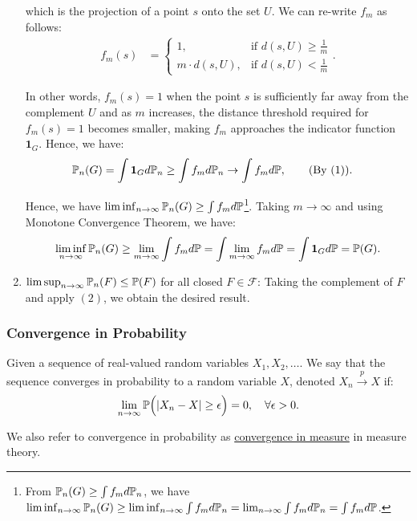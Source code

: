 \begin{proof*}
\begin{enumerate}
        \noindent which is the projection of a point $s$ onto the set $U$. We can re-write $f_m$ as follows:
        \begin{align*}
            f_m(s) &= \begin{cases}
                1, &\text{if } d(s, U) \ge \frac{1}{m} \\
                m\cdot d(s, U), &\text{if } d(s, U) < \frac{1}{m} 
            \end{cases}.
        \end{align*} 

        \noindent In other words, $f_m(s)=1$ when the point $s$ is sufficiently far away from the complement $U$ and as $m$ increases, the distance threshold required for $f_m(s)=1$ becomes smaller, making $f_m$ approaches the indicator function $\boldsymbol{1}_G$. Hence, we have:
        \begin{align*}
            \mathbb{P}_n(G) &= \int \boldsymbol{1}_G d\mathbb{P}_n \ge \int f_md\mathbb{P}_n \to \int f_md\mathbb{P}, \qquad (\text{By (1)}).
        \end{align*} 

        \noindent Hence, we have $\liminf_{n\to\infty}\mathbb{P}_n(G) \ge \int f_md\mathbb{P}$\footnote{From $\mathbb{P}_n(G) \ge \int f_md\mathbb{P}_n$, we have $\liminf_{n\to\infty} \mathbb{P}_n(G) \ge \liminf_{n\to\infty} \int f_m d\mathbb{P}_n = \lim_{n\to\infty}\int f_m d\mathbb{P}_n = \int f_m d\mathbb{P}$.}. Taking $m\to\infty$ and using Monotone Convergence Theorem, we have:
        \begin{align*}
            \liminf_{n\to\infty} \mathbb{P}_n(G) \ge \lim_{m\to\infty}\int f_md\mathbb{P} = \int \lim_{m\to\infty} f_m d\mathbb{P} = \int \boldsymbol{1}_Gd\mathbb{P} = \mathbb{P}(G). 
        \end{align*} 

        \item $\limsup_{n\to\infty}\mathbb{P}_n(F) \le \mathbb{P}(F)$ for all closed $F\in\mathcal{F}$: Taking the complement of $F$ and apply $(2)$, we obtain the desired result.
    \end{enumerate} 
\end{proof*} 

\subsubsection{Convergence in Probability}
\begin{definition}
    Given a sequence of real-valued random variables $X_1, X_2, \dots$. We say that the sequence converges in probability to a random variable $X$, denoted $X_n\xrightarrow{p}X$ if:
    \begin{equation}
        \lim_{n\to\infty} \mathbb{P}\Big( |X_n - X| \ge \epsilon \Big) = 0, \quad \forall \epsilon > 0.
    \end{equation}

    \noindent We also refer to convergence in probability as \underline{convergence in measure} in measure theory.
\end{definition}

